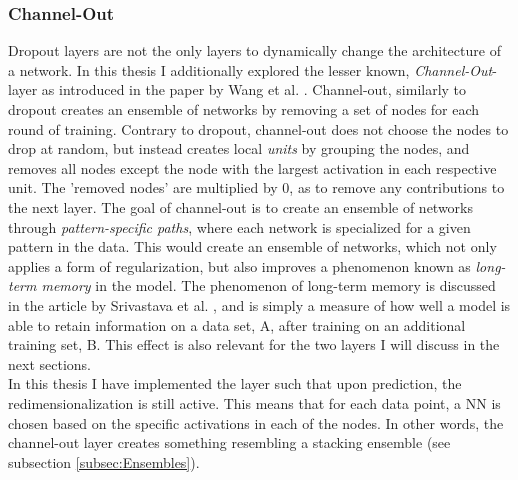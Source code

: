 \subsubsection*{Channel-Out}\label{subsubsec:Channel-Out}
Dropout layers are not the only layers to dynamically change the architecture of a network. In this thesis I additionally 
explored the lesser known, \emph{Channel-Out}-layer as introduced in the paper by Wang et al. \cite{wang_maxout_2013}. 
Channel-out, similarly to dropout creates an ensemble of networks by removing a set 
of nodes for each round of training. Contrary to dropout, channel-out does not choose the nodes to drop at random,
but instead creates local \emph{units} by grouping the nodes, and removes all nodes except the node with the largest
activation in each respective unit. The 'removed nodes' are multiplied by 0, as to remove any contributions to the next layer.
The goal of channel-out is to create an ensemble of networks through \emph{pattern-specific paths},
where each network is specialized for a given pattern in the data. This would create an ensemble of networks, which not only applies a form of 
regularization, but also improves a phenomenon known as \emph{long-term memory} in the model. The phenomenon of long-term memory is discussed in 
the article by Srivastava et al. \cite{srivastava_compete_2013}, and is simply a measure of how well a model is able to retain information on a data set, A, after 
training on an additional training set, B. This effect is also relevant for the two layers I will discuss in the next sections.
\\
In this thesis I have implemented the layer such that upon prediction, the redimensionalization 
is still active. This means that for each data point, a \ac{NN} is chosen based on the specific activations in 
each of the nodes. In other words, the channel-out layer creates something resembling a stacking ensemble (see subsection 
\ref{subsec:Ensembles}). 

